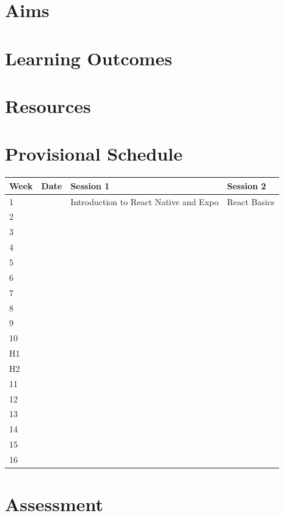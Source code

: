 \documentclass{article}
\begin{document}
\section*{Aims}

\section*{Learning Outcomes}

\section*{Resources}
 
\section*{Provisional Schedule}

\renewcommand{\arraystretch}{1.5}
\begin{tabular}{|l|l|l|l|}
\hline
 Week & Date & \multicolumn{1}{l|}{Session 1} & \multicolumn{1}{l|}{Session 2}   \\ \hline
 1    &      & Introduction to React Native and Expo & React Basics              \\ \hline
 2    & & &         \\ \hline
 3    & & &         \\ \hline
 4    & & &         \\ \hline
 5    & & &         \\ \hline
 6    & & &         \\ \hline
 7    & & &         \\ \hline
 8    & & &         \\ \hline
 9    & & &         \\ \hline
 10   & & &         \\ \hline
 H1   & & &         \\ \hline
 H2   & & &         \\ \hline
 11   & & &         \\ \hline
 12   & & &         \\ \hline
 13   & & &         \\ \hline
 14   & & &         \\ \hline
 15   & & &         \\ \hline
 16   & & &         \\ \hline
\end{tabular}

\section*{Assessment}
\end{document}
